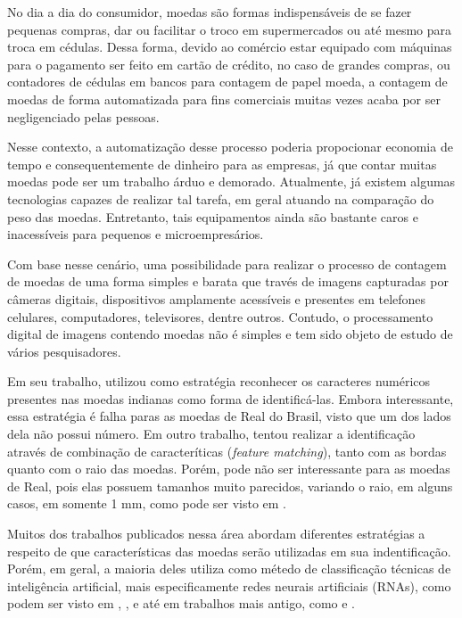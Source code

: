\documentclass[10pt,journal,compsoc]{IEEEtran}
\begin{document}
No dia a dia do consumidor, moedas são formas indispensáveis de se fazer pequenas compras, dar ou facilitar o troco em supermercados ou até mesmo para troca em cédulas. Dessa forma, devido ao comércio estar equipado com máquinas para o pagamento ser feito em cartão de crédito, no caso de grandes compras, ou contadores de cédulas em bancos para contagem de papel moeda, a contagem de moedas de forma automatizada para fins comerciais  muitas vezes acaba por ser negligenciado pelas pessoas.

Nesse contexto, a automatização desse processo poderia propocionar economia de tempo e consequentemente de dinheiro para as empresas, já que contar muitas moedas pode ser um trabalho árduo e demorado. Atualmente, já existem algumas tecnologias capazes de realizar tal tarefa, em geral atuando na comparação do peso das moedas. Entretanto, tais equipamentos ainda são bastante caros e inacessíveis para pequenos e microempresários.

Com base nesse cenário, uma possibilidade para realizar o processo de contagem de moedas de uma forma simples e barata que través de imagens capturadas por câmeras digitais, dispositivos amplamente acessíveis e presentes em telefones celulares, computadores, televisores, dentre outros. Contudo, o processamento digital de imagens contendo moedas não é simples e tem sido objeto de estudo de vários pesquisadores.

Em seu trabalho, \cite{bremananth2005new} utilizou como estratégia reconhecer os caracteres numéricos presentes nas moedas indianas como forma de identificá-las. Embora interessante, essa estratégia é falha paras as moedas de Real do Brasil, visto que um dos lados dela não possui número. Em outro trabalho, \cite{chetan2013robust} tentou realizar a identificação através de combinação de caracteríticas (\textit{feature matching}), tanto com as bordas quanto com o raio das moedas. Porém, pode não ser interessante para as moedas de Real, pois elas possuem tamanhos muito parecidos, variando o raio, em alguns casos, em somente 1 mm, como pode ser visto em \cite{bcb}.

Muitos dos trabalhos publicados nessa área abordam diferentes estratégias a respeito de que características das moedas serão utilizadas em sua indentificação. Porém, em geral, a maioria deles utiliza como métedo de classificação técnicas de inteligência artificial, mais especificamente redes neurais artificiais (RNAs), como podem ser visto em \cite{bremananth2005new}, \cite{kaur2015coin}, \cite{modi2013automated} e até em trabalhos mais antigo, como e \cite{fukumi1992rotation}.
\end{document}
